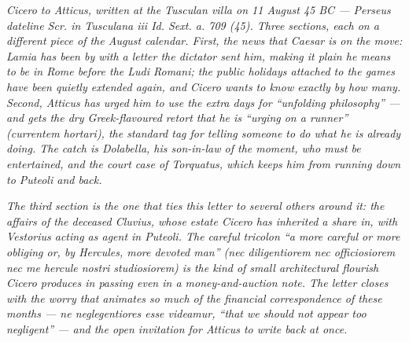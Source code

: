 
\textit{Cicero to Atticus, written at the Tusculan villa on 11
August 45 BC --- Perseus dateline \textit{Scr. in Tusculana iii
Id. Sext. a. 709 (45)}. Three sections, each on a different
piece of the August calendar. First, the news that Caesar is on
the move: Lamia has been by with a letter the dictator sent him,
making it plain he means to be in Rome before the
\textit{Ludi Romani}; the public holidays attached to the games
have been quietly extended again, and Cicero wants to know
exactly by how many. Second, Atticus has urged him to use the
extra days for ``unfolding philosophy'' --- and gets the dry
Greek-flavoured retort that he is ``urging on a runner''
(\textit{currentem hortari}), the standard tag for telling
someone to do what he is already doing. The catch is Dolabella,
his son-in-law of the moment, who must be entertained, and the
court case of Torquatus, which keeps him from running down to
Puteoli and back.}

\textit{The third section is the one that ties this letter to
several others around it: the affairs of the deceased Cluvius,
whose estate Cicero has inherited a share in, with Vestorius
acting as agent in Puteoli. The careful tricolon ``a more
careful or more obliging or, by Hercules, more devoted man''
(\textit{nec diligentiorem nec officiosiorem nec me hercule
nostri studiosiorem}) is the kind of small architectural
flourish Cicero produces in passing even in a money-and-auction
note. The letter closes with the worry that animates so much of
the financial correspondence of these months ---
\textit{ne neglegentiores esse videamur}, ``that we should not
appear too negligent'' --- and the open invitation for Atticus
to write back at once.}
